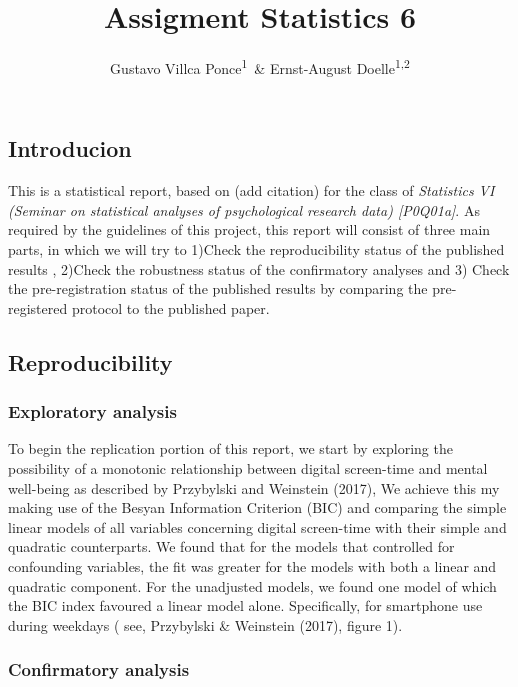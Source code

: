 \documentclass[man]{apa6}
\title{Assigment Statistics 6}
\author{Gustavo Villca Ponce\textsuperscript{1}~\& Ernst-August Doelle\textsuperscript{1,2}}
\affiliation{
    \vspace{0.5cm}
          \textsuperscript{1} Wilhelm-Wundt-University\\
          \textsuperscript{2} Konstanz Business School  }
\theoremstyle{definition}
\theoremstyle{definition}
\theoremstyle{definition}
\theoremstyle{remark}
\begin{document}
\maketitle

\setcounter{secnumdepth}{0}



\hypertarget{introducion}{%
\subsection{Introducion}\label{introducion}}

This is a statistical report, based on (add citation) for the class of
\emph{Statistics VI (Seminar on statistical analyses of psychological
research data) {[}P0Q01a{]}}. As required by the guidelines of this
project, this report will consist of three main parts, in which we will
try to 1)Check the reproducibility status of the published results ,
2)Check the robustness status of the confirmatory analyses and 3) Check
the pre-registration status of the published results by comparing the
pre-registered protocol to the published paper.

\hypertarget{reproducibility}{%
\subsection{Reproducibility}\label{reproducibility}}

\hypertarget{exploratory-analysis}{%
\subsubsection{Exploratory analysis}\label{exploratory-analysis}}

To begin the replication portion of this report, we start by exploring
the possibility of a monotonic relationship between digital screen-time
and mental well-being as described by Przybylski and Weinstein (2017),
We achieve this my making use of the Besyan Information Criterion (BIC)
and comparing the simple linear models of all variables concerning
digital screen-time with their simple and quadratic counterparts. We
found that for the models that controlled for confounding variables, the
fit was greater for the models with both a linear and quadratic
component. For the unadjusted models, we found one model of which the
BIC index favoured a linear model alone. Specifically, for smartphone
use during weekdays ( see, Przybylski \& Weinstein (2017), figure 1).

\hypertarget{confirmatory-analysis}{%
\subsubsection{Confirmatory analysis}\label{confirmatory-analysis}}
\end{document}
